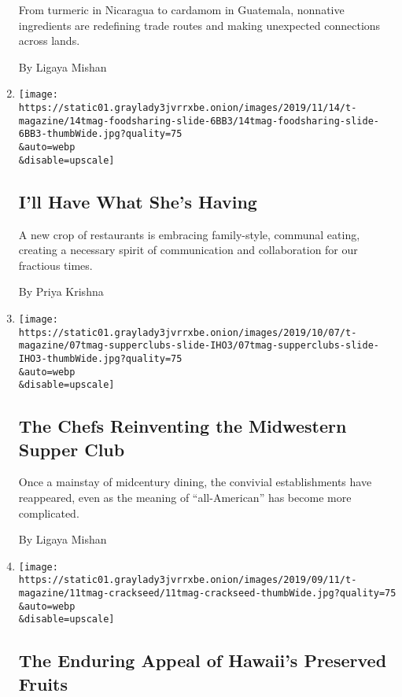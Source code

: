 \begin{enumerate}
  From turmeric in Nicaragua to cardamom in Guatemala, nonnative
  ingredients are redefining trade routes and making unexpected
  connections across lands.

  By Ligaya Mishan
\item
  \href{/2019/11/13/t-magazine/food-sharing-restaurants.html}{}

  \texttt{[image: https://static01.graylady3jvrrxbe.onion/images/2019/11/14/t-magazine/14tmag-foodsharing-slide-6BB3/14tmag-foodsharing-slide-6BB3-thumbWide.jpg?quality=75\\\&auto=webp\\\&disable=upscale]}

  \hypertarget{ill-have-what-shes-having}{%
  \subsection{I'll Have What She's
  Having}\label{ill-have-what-shes-having}}

  A new crop of restaurants is embracing family-style, communal eating,
  creating a necessary spirit of communication and collaboration for our
  fractious times.

  By Priya Krishna
\item
  \href{/2019/10/07/t-magazine/supper-clubs.html}{}

  \texttt{[image: https://static01.graylady3jvrrxbe.onion/images/2019/10/07/t-magazine/07tmag-supperclubs-slide-IHO3/07tmag-supperclubs-slide-IHO3-thumbWide.jpg?quality=75\\\&auto=webp\\\&disable=upscale]}

  \hypertarget{the-chefs-reinventing-the-midwestern-supper-club}{%
  \subsection{The Chefs Reinventing the Midwestern Supper
  Club}\label{the-chefs-reinventing-the-midwestern-supper-club}}

  Once a mainstay of midcentury dining, the convivial establishments
  have reappeared, even as the meaning of ``all-American'' has become
  more complicated.

  By Ligaya Mishan
\item
  \href{/2019/09/11/t-magazine/crack-seed.html}{}

  \texttt{[image: https://static01.graylady3jvrrxbe.onion/images/2019/09/11/t-magazine/11tmag-crackseed/11tmag-crackseed-thumbWide.jpg?quality=75\\\&auto=webp\\\&disable=upscale]}

  \hypertarget{the-enduring-appeal-of-hawaiis-preserved-fruits}{%
  \subsection{The Enduring Appeal of Hawaii's Preserved
  Fruits}\label{the-enduring-appeal-of-hawaiis-preserved-fruits}}


\end{enumerate}
